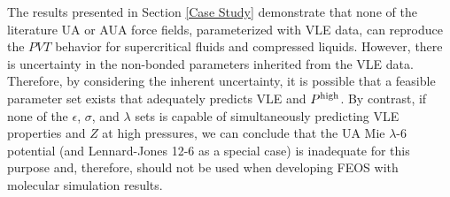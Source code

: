 \documentclass[preprint,letterpaper,floatfix,citeautoscript,aip,jcp]{revtex4-1}
\begin{document}
The results presented in Section \ref{Case Study} demonstrate that none of the literature UA or AUA force fields, parameterized with VLE data, can reproduce the $PVT$ behavior for supercritical fluids and compressed liquids. However, there is uncertainty in the non-bonded parameters inherited from the VLE data. Therefore, by considering the inherent uncertainty, it is possible that 
a feasible parameter set exists that adequately predicts VLE and $P^{\rm high}$. By contrast, if none of the $\epsilon$, $\sigma$, and $\lambda$ sets is capable of simultaneously predicting VLE properties and $Z$ at high pressures, we can conclude that the UA Mie $\lambda$-6 potential (and Lennard-Jones 12-6 as a special case) is inadequate for this purpose and, therefore, should not be used when developing FEOS with molecular simulation results. 


\end{document}
